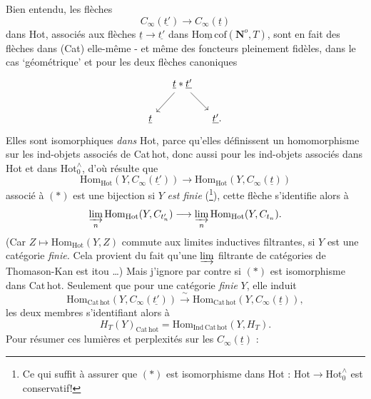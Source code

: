 \documentclass[11pt]{article}
\newcommand{\printedpage}[1]{\marginpar{\footnotesize p.~#1}}
\newcommand{\msp}[1]{\marginpar{\footnotesize [#1]}}
\newcommand{\Hot}{\mathrm{Hot}}
\newcommand{\Hotz}{\mathrm{Hot}_0^{\wedge}}
\newcommand{\Hc}{\underline{\mathrm{Hom\,cof}}}
\newcommand{\Nop}{\mathbf{N}^o}
\begin{document}
\printedpage{76}
\msp{page 121}
Bien entendu, les flèches
\[
C_\infty(\underline{t'}) \longrightarrow C_\infty(\underline{t}) \tag*{$(*)$}
\]
dans Hot, associés aux flèches $\underline{t} \longrightarrow \underline{t'}$ dans $\Hc(\Nop, T)$, sont en fait des flèches dans %
(Cat) elle-même - et même des foncteurs pleinement fidèles, dans le cas ‘géométrique’ et pour les deux flèches canoniques
\[
\begin{tikzcd}[column sep=small]
 & \underline{t} * \underline{t'} \arrow[ld] \arrow[rd] & \\
\underline{t} & & \underline{t'}.
\end{tikzcd}
\]
Elles sont isomorphiques \textit{dans} Hot, parce qu'elles définissent un homomorphisme sur les ind-objets associés de Cat\,hot, donc aussi pour les ind-objets associés dans Hot et dans $\Hotz$, d'où résulte que
\[
\mathrm{Hom}_{\Hot}(Y, C_\infty(\underline{t'})) \longrightarrow \mathrm{Hom}_{\Hot}(Y, C_\infty(\underline{t}))
\]
associé à $(*)$ est une bijection si $Y$ \textit{est finie} (\footnote[26]{Ce qui suffit à assurer que $(*)$ est isomorphisme dans Hot : $\Hot \longrightarrow \Hotz$ est conservatif!}), cette flèche s'identifie alors à
\[
\underset{n}{\varinjlim}\, \mathrm{Hom}_{\Hot}(Y, C_{t'_n}) \longrightarrow \underset{n}{\varinjlim}\, \mathrm{Hom}_{\Hot}(Y, C_{t_n}).
\]
(Car $Z \longmapsto \mathrm{Hom}_{\Hot}(Y, Z)$ commute aux limites inductives filtrantes, si $Y$ est une catégorie \textit{finie.} Cela provient du fait qu'une $\varinjlim$ filtrante de catégories de Thomason-Kan est itou \dots) Mais j'ignore par contre si $(*)$ est isomorphisme dans Cat\,hot. Seulement que pour une catégorie \textit{finie} $Y$, elle induit
\[
\mathrm{Hom}_{\mathrm{Cat\,hot}}(Y, C_\infty(\underline{t'})) \xrightarrow{\ \sim\ } \mathrm{Hom}_{\mathrm{Cat\,hot}}(Y, C_\infty(\underline{t})),
\]
les deux membres s'identifiant alors à
\msp{page 122}
\[
H_T(Y)_{\mathrm{Cat\,hot}} = \mathrm{Hom}_{\mathrm{Ind\,Cat\,hot}}(Y, H_T).
\]
Pour résumer ces lumières et perplexités sur les $C_\infty(\underline{t})$ :
\end{document}

